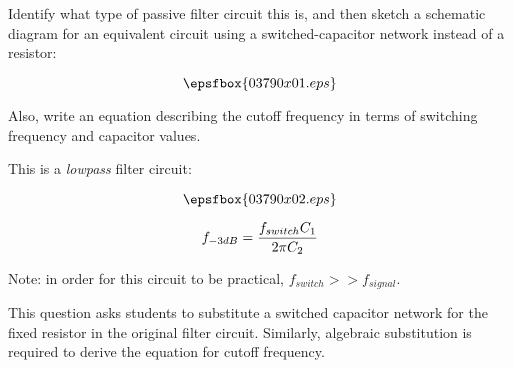 

Identify what type of passive filter circuit this is, and then sketch a schematic diagram for an equivalent circuit using a switched-capacitor network instead of a resistor:

$$\epsfbox{03790x01.eps}$$

Also, write an equation describing the cutoff frequency in terms of switching frequency and capacitor values.







This is a {\it lowpass} filter circuit:

$$\epsfbox{03790x02.eps}$$

$$f_{-3dB} = {{f_{switch} C_1} \over {2 \pi C_2}}$$

\vskip 10pt

Note: in order for this circuit to be practical, $f_{switch} >> f_{signal}$.







This question asks students to substitute a switched capacitor network for the fixed resistor in the original filter circuit.  Similarly, algebraic substitution is required to derive the equation for cutoff frequency.




